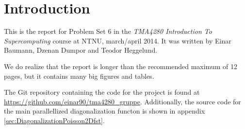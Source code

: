 
\section*{Introduction} %
\label{sec:introduction}
This is the report for Problem Set 6 in the \emph{TMA4280 Introduction To Supercomputing} course at NTNU, march/april 2014. It was written by Einar Baumann, Dzenan Dumpor and Teodor Heggelund.

We do realize that the report is longer than the recommended maximum of 12 pages, but it contains many big figures and tables.

The Git repository containing the code for the project is found at \url{https://github.com/einar90/tma4280\_gruppe}. Additionally, the source code for the main parallellized diagonalization functon is shown in appendix \ref{sec:DiagonalizationPoisson2Dfst}.
\thispagestyle{empty}
\setcounter{page}{0}
